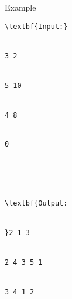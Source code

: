 Example
\begin{verbatim}
\textbf{Input:}


3 2


5 10


4 8


0





\textbf{Output:


}2 1 3


2 4 3 5 1


3 4 1 2


\end{verbatim}
